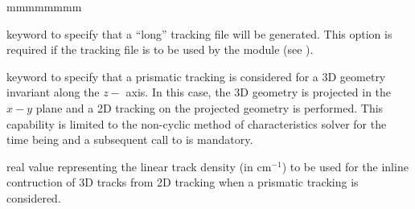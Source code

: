 \begin{ListeDeDescription}{mmmmmmmm}
\item[\moc{LONG}] keyword to specify that a ``long'' tracking file will be generated. This option is required if the tracking file is to be used by the  module (see ).

\item[\moc{PRIZ}] keyword to specify that a prismatic tracking is considered for a 3D geometry invariant along the $z-$ axis. In this case, the 3D geometry is projected in the $x-y$ plane and a 2D tracking on the projected geometry is performed. This capability is limited to the non-cyclic method of characteristics solver for the time being and a subsequent call to  is mandatory.

\item[\dusa{denspr}] real value representing the linear track density (in cm$^{-1}$) to be used for the inline contruction of 3D tracks from 2D tracking when a prismatic tracking is considered.

\end{ListeDeDescription}
\clearpage
